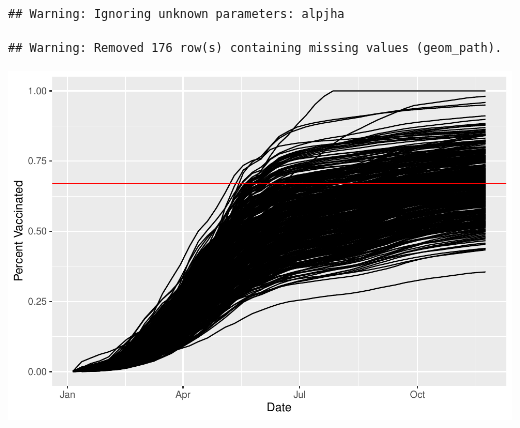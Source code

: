 \documentclass[
]{article}
\begin{document}
\begin{verbatim}
## Warning: Ignoring unknown parameters: alpjha
\end{verbatim}

\begin{verbatim}
## Warning: Removed 176 row(s) containing missing values (geom_path).
\end{verbatim}

\includegraphics{Class17_Vax_files/figure-latex/unnamed-chunk-36-1.pdf}
\end{document}
